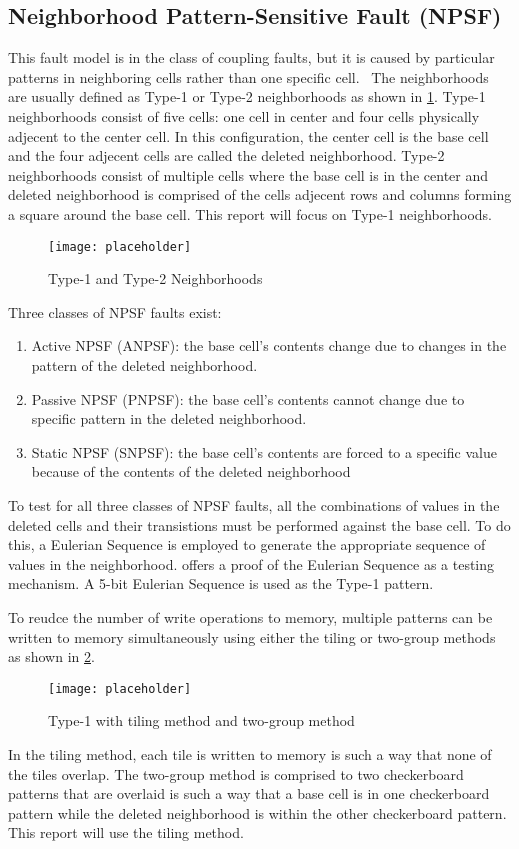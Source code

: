 \subsection{Neighborhood Pattern-Sensitive Fault (NPSF)}
\label{sec:npsf}
This fault model is in the class of coupling faults, but it is caused by particular patterns in neighboring cells rather than one specific cell.  The neighborhoods are usually defined as Type-1 or Type-2 neighborhoods \cite{1047051} as shown in \ref{fig:npsftypes}.  Type-1 neighborhoods consist of five cells: one cell in center and four cells physically adjecent to the center cell.  In this configuration, the center cell is the base cell and the four adjecent cells are called the deleted neighborhood.  Type-2 neighborhoods consist of multiple cells where the base cell is in the center and deleted neighborhood is comprised of the cells adjecent rows and columns forming a square around the base cell.  This report will focus on Type-1 neighborhoods.

\begin{figure}[h]
  \centering
  \texttt{[image: placeholder]}
  \caption{Type-1 and Type-2 Neighborhoods}
  \label{fig:npsftypes}
\end{figure}

Three classes of NPSF faults exist:
\begin{enumerate}
  \item Active NPSF (ANPSF): the base cell's contents change due to changes in the pattern of the deleted neighborhood.
  \item Passive NPSF (PNPSF): the base cell's contents cannot change due to specific pattern in the deleted neighborhood.
  \item Static NPSF (SNPSF): the base cell's contents are forced to a specific value because of the contents of the deleted neighborhood
\end{enumerate}

To test for all three classes of NPSF faults, all the combinations of values in the deleted cells and their transistions must be performed against the base cell.  To do this, a Eulerian Sequence is employed to generate the appropriate sequence of values in the neighborhood.  \cite{1675556} offers a proof of the Eulerian Sequence as a testing mechanism.  A 5-bit Eulerian Sequence is used as the Type-1 pattern.

To reudce the number of write operations to memory, multiple patterns can be written to memory simultaneously using either the tiling or two-group methods as shown in \ref{fig:type1methods}.

\begin{figure}[h]
  \centering
  \texttt{[image: placeholder]}
  \caption{Type-1 with tiling method and two-group method}
  \label{fig:type1methods}
\end{figure}

In the tiling method, each tile is written to memory is such a way that none of the tiles overlap.  The two-group method is comprised to two checkerboard patterns that are overlaid is such a way that a base cell is in one checkerboard pattern while the deleted neighborhood is within the other checkerboard pattern.  This report will use the tiling method.
